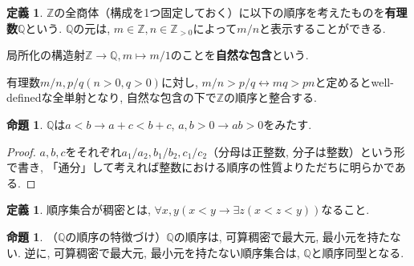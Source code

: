 \documentclass[a4paper, twoside]{bxjsarticle}
\newcommand{\zah}{\mathbb{Z}}
\newcommand{\quo}{\mathbb{Q}}
\theoremstyle{definition}
\newtheorem{prop}[thm]{命題}
\newtheorem{defn}[thm]{定義}
\begin{document}
        \begin{defn}
            $\zah$の全商体（構成を1つ固定しておく）に以下の順序を考えたものを\textbf{有理数}$\quo$という. $\quo$の元は, $m\in \zah, n\in \zah_{>0}$によって$m/n$と表示することができる.
            
            局所化の構造射$\zah\to\quo, m\mapsto m/1$のことを\textbf{自然な包含}という.
        
            有理数$m/n, p/q (n>0, q>0)$に対し, $m/n>p/q \leftrightarrow mq>pn$と定めるとwell-definedな全単射となり, 自然な包含の下で$\zah$の順序と整合する.
        \end{defn}
        \begin{prop}
            $\quo$は$a<b\to a+c<b+c$, $a, b>0 \to ab>0$をみたす.
        \end{prop}
        \begin{proof}
            $a, b, c$をそれぞれ$a_1/a_2, b_1/b_2, c_1/c_2$（分母は正整数, 分子は整数）という形で書き, 「通分」して考えれば整数における順序の性質よりただちに明らかである.
        \end{proof}
        \begin{defn}
            順序集合が稠密とは, $\forall x, y(x<y\to \exists z(x<z<y))$なること.
        \end{defn}
        \begin{prop}
            （$\quo$の順序の特徴づけ）$\quo$の順序は, 可算稠密で最大元, 最小元を持たない. 逆に, 可算稠密で最大元, 最小元を持たない順序集合は, $\quo$と順序同型となる.
        \end{prop}
\end{document}
